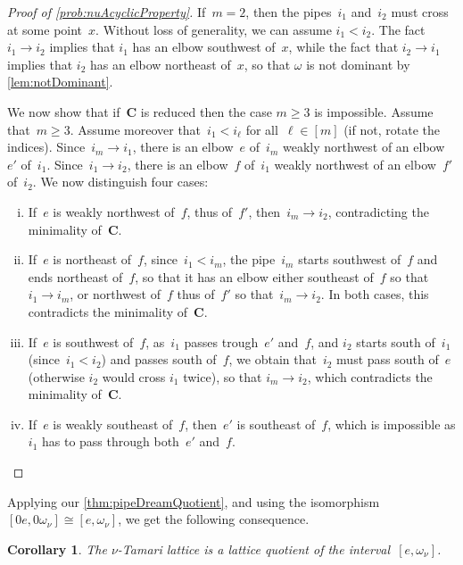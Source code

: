\documentclass[reqno]{amsart}
\newtheorem{corollary}[theorem]{Corollary}
\theoremstyle{definition}
\renewcommand{\b}[1]{\boldsymbol{#1}} %
\begin{document}
\begin{proof}[Proof of \cref{prob:nuAcyclicProperty}]
If~$m = 2$, then the pipes~$i_1$ and~$i_2$ must cross at some point~$x$.
Without loss of generality, we can assume $i_1<i_2$. 
The fact $i_1 \to i_2$ implies that $i_1$ has an elbow southwest of~$x$, while the fact that $i_2 \to i_1$ implies that $i_2$ has an elbow northeast of~$x$, so that $\omega$ is not dominant by \cref{lem:notDominant}.

We now show that if~$\b{C}$ is reduced then the case $m\geq 3$ is impossible.
Assume that~$m \ge 3$.
Assume moreover that~$i_1 < i_\ell$ for all~$\ell \in [m]$ (if not, rotate the indices).
Since~$i_m \to i_1$, there is an elbow~$e$ of~$i_m$ weakly northwest of an elbow~$e'$ of~$i_1$.
Since~$i_1 \to i_2$, there is an elbow~$f$ of~$i_1$ weakly northwest of an elbow~$f'$ of~$i_2$.
We now distinguish four cases:
\begin{enumerate}[(i)]
\item If~$e$ is weakly northwest of~$f$, thus of~$f'$, then~$i_m \to i_2$, contradicting the minimality of~$\b{C}$.
\item If~$e$ is northeast of~$f$, since~$i_1 < i_m$, the pipe~$i_m$ starts southwest of~$f$ and ends northeast of~$f$, so that it has an elbow either southeast of~$f$ so that~$i_1 \to i_m$, or northwest of~$f$ thus of~$f'$ so that~$i_m \to i_2$. In both cases, this contradicts the minimality of~$\b{C}$.
\item If~$e$ is southwest of~$f$, as~$i_1$ passes trough~$e'$ and~$f$, and $i_2$ starts south of~$i_1$ (since~$i_1 < i_2$) and passes south of~$f$, we obtain that~$i_2$ must pass south of~$e$ (otherwise $i_2$ would cross $i_1$ twice), so that $i_m \to i_2$, which contradicts the minimality of~$\b{C}$.
\item If~$e$ is weakly southeast of~$f$, then~$e'$ is southeast of~$f$, which is impossible as $i_1$ has to pass through both~$e'$ and~$f$.
\qedhere
\end{enumerate}
\end{proof}

Applying our \cref{thm:pipeDreamQuotient}, and using the isomorphism $[0e,0\omega_\nu]\cong [e,\omega_\nu]$, we get the following consequence.

\begin{corollary}
The $\nu$-Tamari lattice is a lattice quotient of the interval~$[e,\omega_\nu]$.
\end{corollary}  

\end{document}
